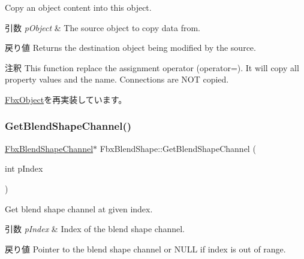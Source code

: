 Copy an object content into this object. 
\begin{DoxyParams}{引数}
{\em p\+Object} & The source object to copy data from. \\
\hline
\end{DoxyParams}
\begin{DoxyReturn}{戻り値}
Returns the destination object being modified by the source. 
\end{DoxyReturn}
\begin{DoxyRemark}{注釈}
This function replace the assignment operator (operator=). It will copy all property values and the name. Connections are N\+OT copied. 
\end{DoxyRemark}


\hyperlink{class_fbx_object_a0c0c5adb38284d14bb82c04d54504a3e}{Fbx\+Object}を再実装しています。

\mbox{\label{class_fbx_blend_shape_aac445f8468f3135f5c810ef51a089ff2}} 
\subsubsection{\texorpdfstring{Get\+Blend\+Shape\+Channel()}{GetBlendShapeChannel()}\hspace{0.1cm}{\footnotesize\ttfamily [1/2]}}
{\footnotesize\ttfamily \hyperlink{class_fbx_blend_shape_channel}{Fbx\+Blend\+Shape\+Channel}$\ast$ Fbx\+Blend\+Shape\+::\+Get\+Blend\+Shape\+Channel (\begin{DoxyParamCaption}\item[{int}]{p\+Index }\end{DoxyParamCaption})}

Get blend shape channel at given index. 
\begin{DoxyParams}{引数}
{\em p\+Index} & Index of the blend shape channel. \\
\hline
\end{DoxyParams}
\begin{DoxyReturn}{戻り値}
Pointer to the blend shape channel or {\ttfamily N\+U\+LL} if index is out of range. 
\end{DoxyReturn}
\mbox{\label{class_fbx_blend_shape_a2f945fdf198655b0434e5bde7d897a8a}} 
